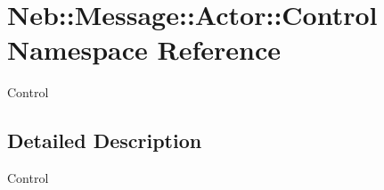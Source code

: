 \hypertarget{namespaceNeb_1_1Message_1_1Actor_1_1Control}{\section{\-Neb\-:\-:\-Message\-:\-:\-Actor\-:\-:\-Control \-Namespace \-Reference}
\label{namespaceNeb_1_1Message_1_1Actor_1_1Control}
}


\-Control  




\subsection{\-Detailed \-Description}
\-Control 